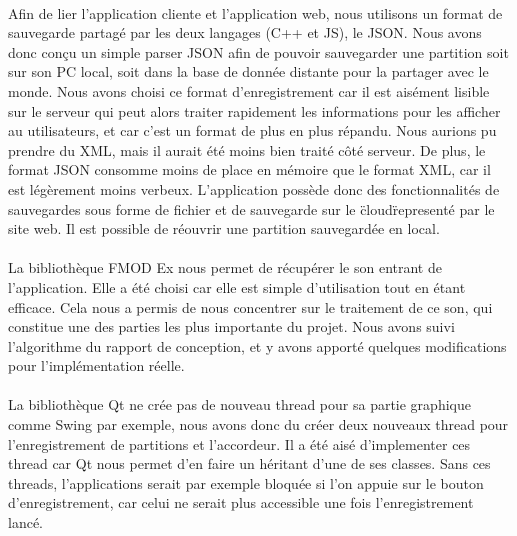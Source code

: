 \paragraph{}
Afin de lier l'application cliente et l'application web, nous utilisons un format de sauvegarde partagé par les deux 
langages (C++ et JS), le JSON. Nous avons donc conçu un simple parser JSON afin de pouvoir sauvegarder une partition 
soit sur son PC local, soit dans la base de donnée distante pour la partager avec le monde. Nous avons choisi 
ce format d'enregistrement car il est aisément lisible sur le serveur qui peut alors traiter rapidement les informations 
pour les afficher au utilisateurs, et car c'est un format de plus en plus répandu. Nous aurions pu prendre du XML, mais 
il aurait été moins bien traité côté serveur. De plus, le format JSON consomme moins de place en mémoire que le format XML,
car il est légèrement moins verbeux. L'application possède donc des fonctionnalités de sauvegardes sous forme de fichier et 
de sauvegarde sur le \"cloud\" representé par le site web. Il est possible de réouvrir une partition sauvegardée en local.

\paragraph{}
La bibliothèque FMOD Ex nous permet de récupérer le son entrant de l'application. Elle a été choisi car elle est simple 
d'utilisation tout en étant efficace. Cela nous a permis de nous concentrer sur le traitement de ce son, qui constitue 
une des parties les plus importante du projet. Nous avons suivi l'algorithme du rapport de conception, et y avons apporté 
quelques modifications pour l'implémentation réelle.

\paragraph{}
La bibliothèque Qt ne crée pas de nouveau thread pour sa partie graphique comme Swing par exemple, nous avons donc du créer deux nouveaux 
thread pour l'enregistrement de partitions et l'accordeur. Il a été aisé d'implementer ces thread car Qt nous permet d'en 
faire un héritant d'une de ses classes. Sans ces threads, l'applications serait par exemple bloquée si l'on appuie sur le 
bouton d'enregistrement, car celui ne serait plus accessible une fois l'enregistrement lancé.
